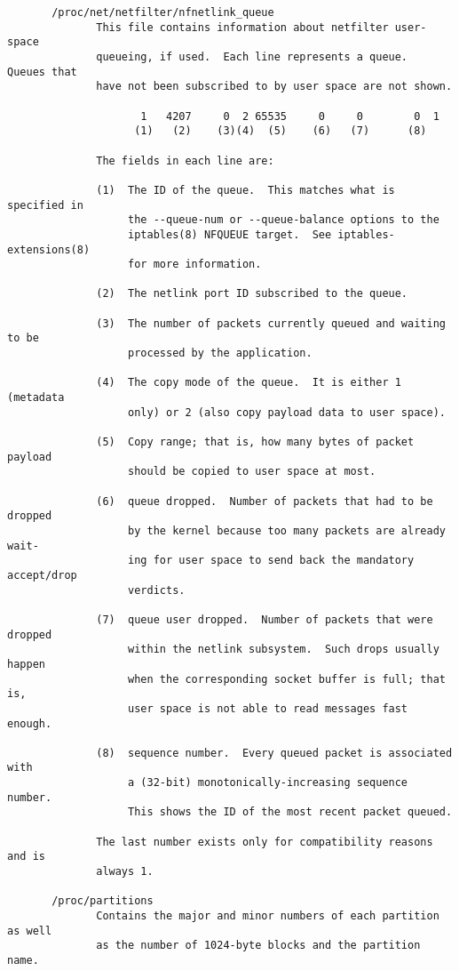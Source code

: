 \documentclass[]{article}
\begin{document}
\begin{verbatim}
       /proc/net/netfilter/nfnetlink_queue
              This file contains information about netfilter user-space
              queueing, if used.  Each line represents a queue.  Queues that
              have not been subscribed to by user space are not shown.

                     1   4207     0  2 65535     0     0        0  1
                    (1)   (2)    (3)(4)  (5)    (6)   (7)      (8)

              The fields in each line are:

              (1)  The ID of the queue.  This matches what is specified in
                   the --queue-num or --queue-balance options to the
                   iptables(8) NFQUEUE target.  See iptables-extensions(8)
                   for more information.

              (2)  The netlink port ID subscribed to the queue.

              (3)  The number of packets currently queued and waiting to be
                   processed by the application.

              (4)  The copy mode of the queue.  It is either 1 (metadata
                   only) or 2 (also copy payload data to user space).

              (5)  Copy range; that is, how many bytes of packet payload
                   should be copied to user space at most.

              (6)  queue dropped.  Number of packets that had to be dropped
                   by the kernel because too many packets are already wait‐
                   ing for user space to send back the mandatory accept/drop
                   verdicts.

              (7)  queue user dropped.  Number of packets that were dropped
                   within the netlink subsystem.  Such drops usually happen
                   when the corresponding socket buffer is full; that is,
                   user space is not able to read messages fast enough.

              (8)  sequence number.  Every queued packet is associated with
                   a (32-bit) monotonically-increasing sequence number.
                   This shows the ID of the most recent packet queued.

              The last number exists only for compatibility reasons and is
              always 1.

       /proc/partitions
              Contains the major and minor numbers of each partition as well
              as the number of 1024-byte blocks and the partition name.


\end{verbatim}
\end{document}
